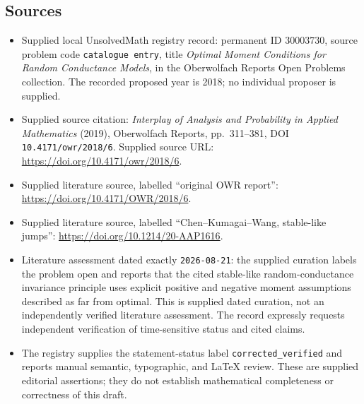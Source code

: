 \documentclass[11pt]{article}
\begin{document}
\subsection{Sources}
\begin{itemize}
\item Supplied local UnsolvedMath registry record: permanent ID \(30003730\), source problem code \texttt{catalogue entry}, title \emph{Optimal Moment Conditions for Random Conductance Models}, in the Oberwolfach Reports Open Problems collection. The recorded proposed year is 2018; no individual proposer is supplied.
\item Supplied source citation: \emph{Interplay of Analysis and Probability in Applied Mathematics} (2019), Oberwolfach Reports, pp.\ 311--381, DOI \texttt{10.4171/owr/2018/6}. Supplied source URL: \url{https://doi.org/10.4171/owr/2018/6}.
\item Supplied literature source, labelled ``original OWR report'': \url{https://doi.org/10.4171/OWR/2018/6}.
\item Supplied literature source, labelled ``Chen--Kumagai--Wang, stable-like jumps'': \url{https://doi.org/10.1214/20-AAP1616}.
\item Literature assessment dated exactly \texttt{2026-08-21}: the supplied curation labels the problem open and reports that the cited stable-like random-conductance invariance principle uses explicit positive and negative moment assumptions described as far from optimal. This is supplied dated curation, not an independently verified literature assessment. The record expressly requests independent verification of time-sensitive status and cited claims.
\item The registry supplies the statement-status label \texttt{corrected\_verified} and reports manual semantic, typographic, and LaTeX review. These are supplied editorial assertions; they do not establish mathematical completeness or correctness of this draft.
\end{itemize}
\end{document}
